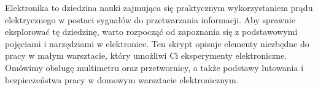 % 
% 
% 
% 

Elektronika to dziedzina nauki zajmująca się praktycznym wykorzystaniem prądu elektrycznego w postaci sygnałów do przetwarzania
informacji. Aby sprawnie eksplorować tę dziedzinę, warto rozpocząć od zapoznania się z podstawowymi pojęciami i narzędziami w
elektronice. Ten skrypt opisuje elementy niezbędne do pracy w małym warsztacie, który umożliwi Ci eksperymenty elektroniczne.
Omówimy obsługę multimetru oraz przetwornicy, a także podstawy lutowania i bezpieczeństwa pracy w domowym warsztacie elektronicznym.
